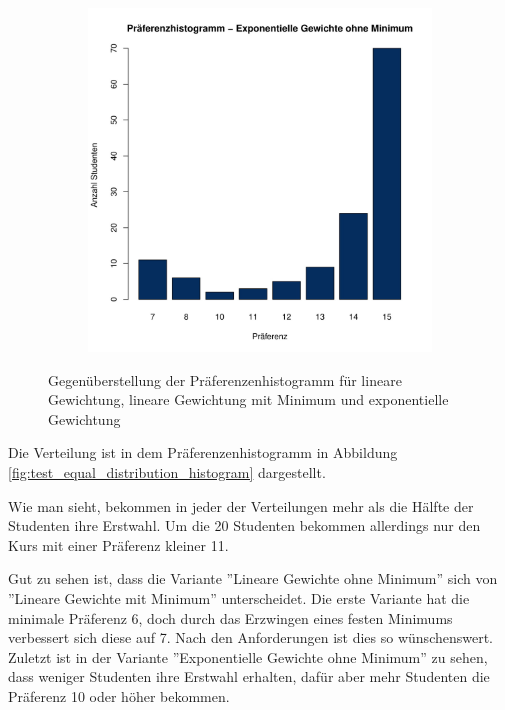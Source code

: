 \begin{figure}
\begin{subfigure}{0.30\textwidth}
				\end{subfigure}
			\begin{subfigure}{0.3\textwidth}
				\includegraphics[width=1.0\textwidth]{./testing/images/NormalDistPreferencesHistExpo.jpg}
			\end{subfigure}
				\caption{Gegenüberstellung der Präferenzenhistogramm für lineare Gewichtung, lineare Gewichtung mit Minimum und exponentielle Gewichtung}
				\label{fig:test_norm_distribution_histogram}
			\end{figure}
		
			Die Verteilung ist in dem Präferenzenhistogramm in Abbildung \ref{fig:test_equal_distribution_histogram} dargestellt.\newline
			
			Wie man sieht, bekommen in jeder der Verteilungen mehr als die Hälfte der Studenten ihre Erstwahl.
			Um die 20 Studenten bekommen allerdings nur den Kurs mit einer Präferenz kleiner 11.\newline
			
			Gut zu sehen ist, dass die Variante ''Lineare Gewichte ohne Minimum'' sich von ''Lineare Gewichte mit Minimum'' unterscheidet.
			Die erste Variante hat die minimale Präferenz 6, doch durch das Erzwingen eines festen Minimums verbessert sich diese auf 7.
			Nach den Anforderungen ist dies so wünschenswert.
			Zuletzt ist in der Variante ''Exponentielle Gewichte ohne Minimum'' zu sehen, dass weniger Studenten ihre Erstwahl erhalten, dafür aber mehr Studenten die Präferenz 10 oder höher bekommen.\newline
			
